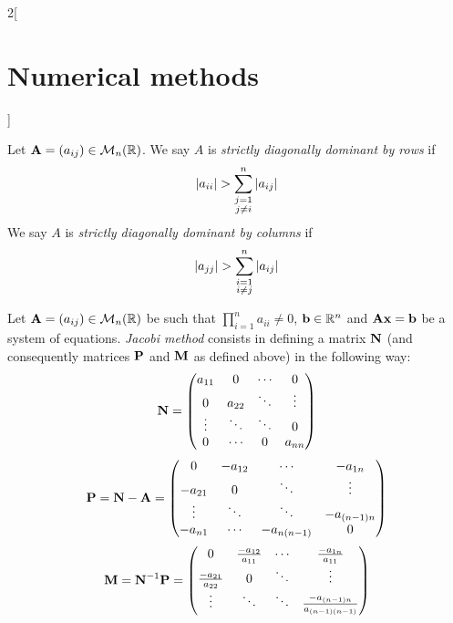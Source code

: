 \documentclass[../../../main_math.tex]{subfiles}
\begin{document}
\begin{multicols}{2}[\section{Numerical methods}]
\begin{proposition}
  \end{proposition}
  \begin{definition}
    Let $\boldsymbol{\mathrm{A}}=(a_{ij})\in\mathcal{M}_n(\mathbb{R})$. We say $A$ is \emph{strictly diagonally dominant by rows} if $$|a_{ii}|>\sum_{\substack{j=1\\j\ne i}}^n\abs{a_{ij}}$$
    We say $A$ is \emph{strictly diagonally dominant by columns} if $$|a_{jj}|>\sum_{\substack{i=1\\i\ne j}}^n\abs{a_{ij}}$$
  \end{definition}
  \begin{definition}
    Let $\boldsymbol{\mathrm{A}}=(a_{ij})\in\mathcal{M}_n(\mathbb{R})$ be such that $\prod_{i=1}^na_{ii}\ne 0$, $\boldsymbol{\mathrm{b}}\in\mathbb{R}^n$ and $\boldsymbol{\mathrm{A}}\boldsymbol{\mathrm{x}}=\boldsymbol{\mathrm{b}}$ be a system of equations. \emph{Jacobi method} consists in defining a matrix $\boldsymbol{\mathrm{N}}$ (and consequently matrices $\boldsymbol{\mathrm{P}}$ and $\boldsymbol{\mathrm{M}}$ as defined above) in the following way:
    \begin{equation*}
      \boldsymbol{\mathrm{N}}=
      \begin{pmatrix}
        a_{11} & 0      & \cdots & 0      \\
        0      & a_{22} & \ddots & \vdots \\
        \vdots & \ddots & \ddots & 0      \\
        0      & \cdots & 0      & a_{nn}
      \end{pmatrix}
    \end{equation*}
    \begin{equation*}
      \boldsymbol{\mathrm{P}}=\boldsymbol{\mathrm{N}}-\boldsymbol{\mathrm{A}}=
      \begin{pmatrix}
        0       & -a_{12} & \cdots      & -a_{1n}     \\
        -a_{21} & 0       & \ddots      & \vdots      \\
        \vdots  & \ddots  & \ddots      & -a_{(n-1)n} \\
        -a_{n1} & \cdots  & -a_{n(n-1)} & 0
      \end{pmatrix}
    \end{equation*}
    \begin{equation*}
      \boldsymbol{\mathrm{M}}=\boldsymbol{\mathrm{N}}^{-1}\boldsymbol{\mathrm{P}}=
      \begin{pmatrix}
        0                      & \frac{-a_{12}}{a_{11}} & \cdots                     & \frac{-a_{1n}}{a_{11}}             \\
        \frac{-a_{21}}{a_{22}} & 0                      & \ddots                     & \vdots                             \\
        \vdots                 & \ddots                 & \ddots                     & \frac{-a_{(n-1)n}}{a_{(n-1)(n-1)}} \\

\end{pmatrix}
\end{equation*}
\end{definition}
\end{multicols}
\end{document}
